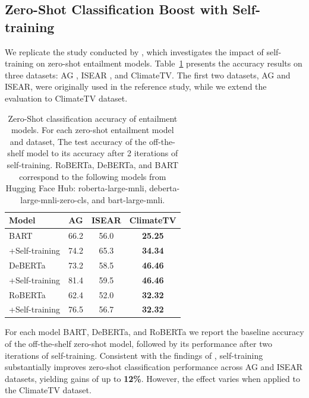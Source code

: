 \subsection{Zero-Shot Classification Boost with Self-training}

We replicate the study conducted by \cite{gera_zero-shot_2022}, which investigates the impact of self-training on zero-shot entailment models. Table~\ref{tab:zero_shot} presents the accuracy results on three datasets: AG \cite{DBLP:journals/corr/ZhangZL15}, ISEAR \cite{Shao2015UniversalityVC}, and ClimateTV. The first two datasets, AG and ISEAR, were originally used in the reference study, while we extend the evaluation to ClimateTV dataset.

\begin{table}[ht]
    \centering
    \begin{tabular}{lccc}
        \toprule
        Model & AG  & ISEAR & ClimateTV \\
        \midrule
        BART & 66.2 & 56.0 & \textbf{25.25} \\
        +Self-training & 74.2 & 65.3 & \textbf{34.34} \\
        \midrule
        DeBERTa & 73.2 & 58.5 & \textbf{46.46} \\
        +Self-training & 81.4 & 59.5 & \textbf{46.46} \\
        \midrule
        RoBERTa & 62.4 & 52.0 & \textbf{32.32} \\
        +Self-training & 76.5 & 56.7 & \textbf{32.32} \\
        \bottomrule
    \end{tabular}
    \caption{Zero-Shot classification accuracy of entailment models. For each zero-shot entailment model and dataset, The test accuracy of the off-the-shelf model to its accuracy after 2 iterations of self-training. RoBERTa, DeBERTa, and BART correspond to the following models from Hugging Face Hub: roberta-large-mnli, deberta-large-mnli-zero-cls, and bart-large-mnli.}
    \label{tab:zero_shot}
\end{table}

For each model BART, DeBERTa, and RoBERTa we report the baseline accuracy of the off-the-shelf zero-shot model, followed by its performance after two iterations of self-training. Consistent with the findings of \citet{gera_zero-shot_2022}, self-training substantially improves zero-shot classification performance across AG and ISEAR datasets, yielding gains of up to \textbf{12\%}. However, the effect varies when applied to the ClimateTV dataset.

